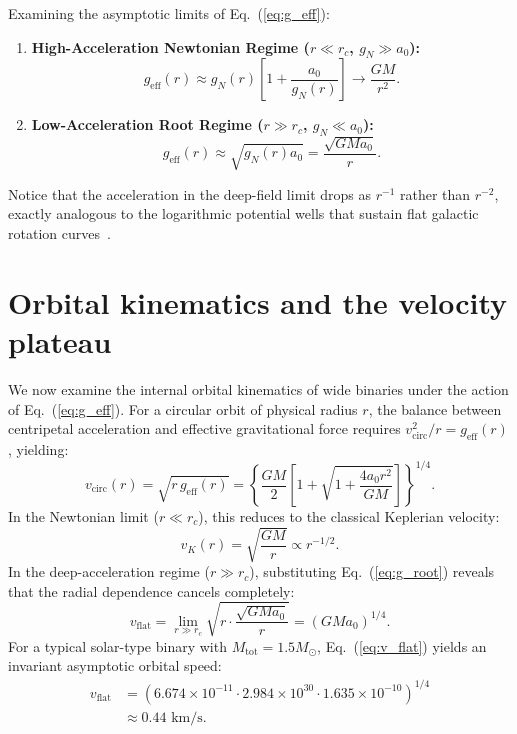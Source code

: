 \documentclass[aps,prd,reprint,superscriptaddress,nofootinbib,floatfix,amsmath,amssymb]{revtex4-2}
\begin{document}
Examining the asymptotic limits of Eq.~(\ref{eq:g_eff}):
\begin{enumerate}
\item \textbf{High-Acceleration Newtonian Regime ($r \ll r_c$, $g_N \gg a_0$):}
\begin{equation}
g_{\text{eff}}(r) \approx g_N(r) \left[ 1 + \frac{a_0}{g_N(r)} \right] \to \frac{G M}{r^2}.
\end{equation}
\item \textbf{Low-Acceleration Root Regime ($r \gg r_c$, $g_N \ll a_0$):}
\begin{equation}
g_{\text{eff}}(r) \approx \sqrt{g_N(r) a_0} = \frac{\sqrt{G M a_0}}{r}.
\label{eq:g_root}
\end{equation}
\end{enumerate}
Notice that the acceleration in the deep-field limit drops as $r^{-1}$ rather than $r^{-2}$, exactly analogous to the logarithmic potential wells that sustain flat galactic rotation curves~\cite{mcgaugh2016radial}.

\section{Orbital kinematics and the velocity plateau}
\label{sec:kinematics}

We now examine the internal orbital kinematics of wide binaries under the action of Eq.~(\ref{eq:g_eff}). For a circular orbit of physical radius $r$, the balance between centripetal acceleration and effective gravitational force requires $v_{\text{circ}}^2 / r = g_{\text{eff}}(r)$, yielding:
\begin{equation}
v_{\text{circ}}(r) = \sqrt{r \, g_{\text{eff}}(r)} = \left\{ \frac{G M}{2} \left[ 1 + \sqrt{1 + \frac{4 a_0 r^2}{G M}} \right] \right\}^{1/4}.
\end{equation}
In the Newtonian limit ($r \ll r_c$), this reduces to the classical Keplerian velocity:
\begin{equation}
v_K(r) = \sqrt{\frac{G M}{r}} \propto r^{-1/2}.
\end{equation}
In the deep-acceleration regime ($r \gg r_c$), substituting Eq.~(\ref{eq:g_root}) reveals that the radial dependence cancels completely:
\begin{equation}
v_{\text{flat}} = \lim_{r \gg r_c} \sqrt{r \cdot \frac{\sqrt{G M a_0}}{r}} = \left(G M a_0\right)^{1/4}.
\label{eq:v_flat}
\end{equation}
For a typical solar-type binary with $M_{\text{tot}} = 1.5 M_\odot$, Eq.~(\ref{eq:v_flat}) yields an invariant asymptotic orbital speed:
\begin{align}
v_{\text{flat}} &= \left(6.674 \times 10^{-11} \cdot 2.984 \times 10^{30} \cdot 1.635 \times 10^{-10}\right)^{1/4} \nonumber \\
&\approx 0.44\text{ km/s}.
\end{align}
\end{document}
